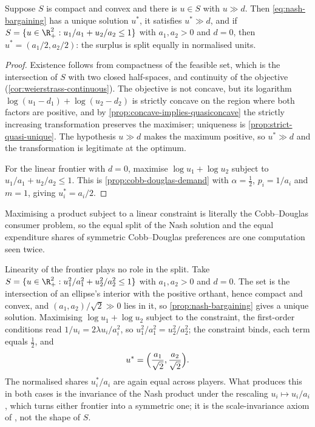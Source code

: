 \begin{proposition}\label{prop:nash-bargaining}
	Suppose $S$ is compact and convex and there is $u\in S$ with $u\gg d$. Then
	\eqref{eq:nash-bargaining} has a unique solution $u^\ast$, it satisfies
	$u^\ast\gg d$, and if $S=\{u\in\R^2_+ : u_1/a_1+u_2/a_2\leq1\}$ with
	$a_1,a_2>0$ and $d=0$, then $u^\ast=(a_1/2,a_2/2)$: the surplus is split
	equally in normalised units.
\end{proposition}

\begin{proof}
	Existence follows from compactness of the feasible set, which is the
	intersection of $S$ with two closed half-spaces, and continuity of the
	objective (\autoref{cor:weierstrass-continuous}). The objective is not concave,
	but its logarithm $\log(u_1-d_1)+\log(u_2-d_2)$ is strictly concave on the
	region where both factors are positive, and by
	\autoref{prop:concave-implies-quasiconcave} the strictly increasing
	transformation preserves the maximiser; uniqueness is
	\autoref{prop:strict-quasi-unique}. The hypothesis $u\gg d$ makes the maximum
	positive, so $u^\ast\gg d$ and the transformation is legitimate at the optimum.

	For the linear frontier with $d=0$, maximise $\log u_1+\log u_2$ subject to
	$u_1/a_1+u_2/a_2\leq1$. This is \autoref{prop:cobb-douglas-demand} with
	$\alpha=\tfrac12$, $p_i=1/a_i$ and $m=1$, giving $u_i^\ast=a_i/2$.
\end{proof}

Maximising a product subject to a linear constraint is literally the
Cobb--Douglas consumer problem, so the equal split of the Nash solution and the
equal expenditure shares of symmetric Cobb--Douglas preferences are one
computation seen twice.

\begin{remark}\label{rem:nash-elliptic}
	Linearity of the frontier plays no role in the split. Take
	$S=\{u\in\R^2_+ : u_1^2/a_1^2+u_2^2/a_2^2\leq1\}$ with $a_1,a_2>0$ and $d=0$.
	The set is the intersection of an ellipse's interior with the positive orthant,
	hence compact and convex, and $(a_1,a_2)/\sqrt2\gg0$ lies in it, so
	\autoref{prop:nash-bargaining} gives a unique solution. Maximising
	$\log u_1+\log u_2$ subject to the constraint, the first-order conditions read
	$1/u_i=2\lambda u_i/a_i^2$, so $u_1^2/a_1^2=u_2^2/a_2^2$; the constraint binds,
	each term equals $\tfrac12$, and
	\[
		u^\ast=\Bigl(\frac{a_1}{\sqrt2},\frac{a_2}{\sqrt2}\Bigr).
	\]
	The normalised shares $u_i^\ast/a_i$ are again equal across players. What
	produces this in both cases is the invariance of the Nash product under the
	rescaling $u_i\mapsto u_i/a_i$, which turns either frontier into a symmetric
	one; it is the scale-invariance axiom of \textcite{nash1950bargaining}, not the
	shape of $S$.
\end{remark}

